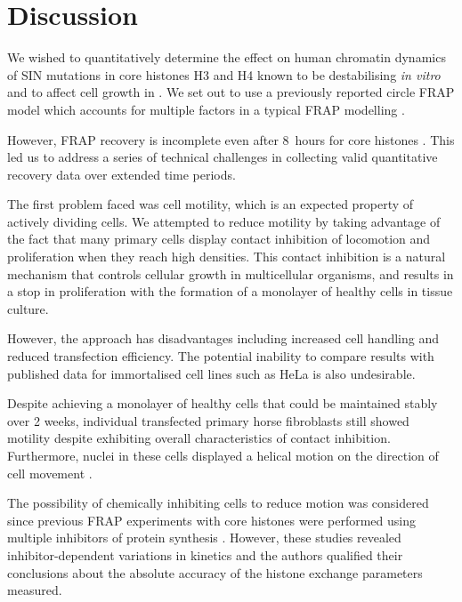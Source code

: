 \section{Discussion}

    We wished to quantitatively determine the
    effect on human chromatin dynamics
    of SIN mutations in core histones H3 and H4 known
    to be destabilising \textit{in vitro} and to affect
    cell growth in .
    We set out to use a previously reported circle FRAP model
    which accounts for multiple factors in a typical
    FRAP modelling \citep{mcnally-frap-code}.

    However, FRAP recovery is incomplete even
    after 8~hours for core histones \citep{KimuraCook}.
    This led us to address a series of technical challenges in
    collecting valid quantitative recovery data over extended time periods.


    The first problem faced was cell motility, which
    is an expected property of actively dividing cells.
    We attempted to reduce motility by taking advantage of
    the fact that many primary cells display contact inhibition of
    locomotion and proliferation when they reach high densities.
    This contact inhibition is a natural mechanism
    that controls cellular growth in
    multicellular organisms, and results in a stop in proliferation
    with the formation of a monolayer of healthy cells in tissue culture.

    However, the approach has disadvantages including
    increased cell handling and reduced transfection efficiency.
    The potential inability to compare results with published data for
    immortalised cell lines such as HeLa is also undesirable.

    Despite achieving a monolayer of healthy cells that
    could be maintained stably over 2 weeks,
    individual transfected primary horse fibroblasts still showed motility
    despite exhibiting overall characteristics of contact inhibition.
    Furthermore, nuclei in these cells displayed a helical motion
    on the direction of cell movement .

    The possibility of chemically inhibiting
    cells to reduce motion was considered
    since previous FRAP experiments with core
    histones were performed using multiple inhibitors
    of protein synthesis \citep{KimuraCook}. However, these studies revealed
    inhibitor-dependent variations in kinetics and the authors qualified
    their conclusions about the absolute accuracy
    of the histone exchange parameters measured.


